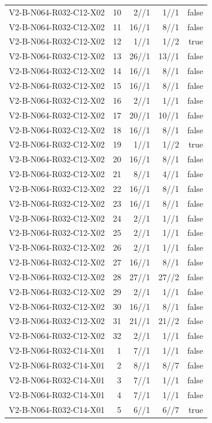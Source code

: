 {\begin{longtable}{lrrrr}
V2-B-N064-R032-C12-X02 & 10 & 2//1 & 1//1 & false \\
V2-B-N064-R032-C12-X02 & 11 & 16//1 & 8//1 & false \\
V2-B-N064-R032-C12-X02 & 12 & 1//1 & 1//2 & true \\
V2-B-N064-R032-C12-X02 & 13 & 26//1 & 13//1 & false \\
V2-B-N064-R032-C12-X02 & 14 & 16//1 & 8//1 & false \\
V2-B-N064-R032-C12-X02 & 15 & 16//1 & 8//1 & false \\
V2-B-N064-R032-C12-X02 & 16 & 2//1 & 1//1 & false \\
V2-B-N064-R032-C12-X02 & 17 & 20//1 & 10//1 & false \\
V2-B-N064-R032-C12-X02 & 18 & 16//1 & 8//1 & false \\
V2-B-N064-R032-C12-X02 & 19 & 1//1 & 1//2 & true \\
V2-B-N064-R032-C12-X02 & 20 & 16//1 & 8//1 & false \\
V2-B-N064-R032-C12-X02 & 21 & 8//1 & 4//1 & false \\
V2-B-N064-R032-C12-X02 & 22 & 16//1 & 8//1 & false \\
V2-B-N064-R032-C12-X02 & 23 & 16//1 & 8//1 & false \\
V2-B-N064-R032-C12-X02 & 24 & 2//1 & 1//1 & false \\
V2-B-N064-R032-C12-X02 & 25 & 2//1 & 1//1 & false \\
V2-B-N064-R032-C12-X02 & 26 & 2//1 & 1//1 & false \\
V2-B-N064-R032-C12-X02 & 27 & 16//1 & 8//1 & false \\
V2-B-N064-R032-C12-X02 & 28 & 27//1 & 27//2 & false \\
V2-B-N064-R032-C12-X02 & 29 & 2//1 & 1//1 & false \\
V2-B-N064-R032-C12-X02 & 30 & 16//1 & 8//1 & false \\
V2-B-N064-R032-C12-X02 & 31 & 21//1 & 21//2 & false \\
V2-B-N064-R032-C12-X02 & 32 & 2//1 & 1//1 & false \\
V2-B-N064-R032-C14-X01 & 1 & 7//1 & 1//1 & false \\
V2-B-N064-R032-C14-X01 & 2 & 8//1 & 8//7 & false \\
V2-B-N064-R032-C14-X01 & 3 & 7//1 & 1//1 & false \\
V2-B-N064-R032-C14-X01 & 4 & 7//1 & 1//1 & false \\
V2-B-N064-R032-C14-X01 & 5 & 6//1 & 6//7 & true \\

\end{longtable}}
